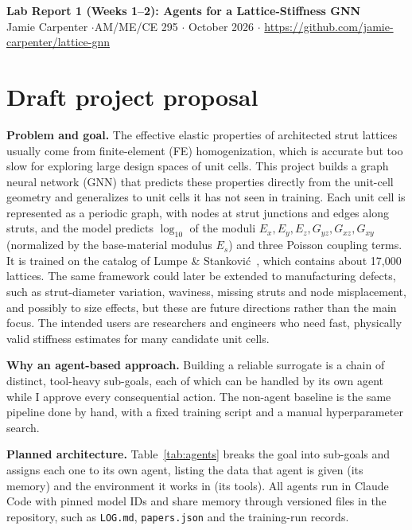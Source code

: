 \documentclass[11pt]{article}
\begin{document}
\begin{center}
  {\Large\bfseries Lab Report 1 (Weeks 1--2): Agents for a Lattice-Stiffness GNN}\\[0.5ex]
  Jamie Carpenter \quad$\cdot$\quad AM/ME/CE 295 \quad$\cdot$ October 2026 \quad$\cdot$\quad
  \url{https://github.com/jamie-carpenter/lattice-gnn}
\end{center}

\section{Draft project proposal}

\textbf{Problem and goal.} The effective elastic properties of architected strut lattices usually
come from finite-element (FE) homogenization, which is accurate but too slow for exploring large
design spaces of unit cells. This project builds a graph neural network (GNN) that predicts these
properties directly from the unit-cell geometry and generalizes to unit cells it has not seen in
training. Each unit cell is represented as a periodic graph, with nodes at strut junctions and edges
along struts, and the model predicts $\log_{10}$ of the moduli $E_x, E_y, E_z, G_{yz}, G_{xz},
G_{xy}$ (normalized by the base-material modulus $E_s$) and three Poisson coupling terms. It is
trained on the catalog of Lumpe \& Stankovi\'c~\cite{lumpe}, which contains about 17,000
lattices. The same framework could later be extended to manufacturing defects, such as
strut-diameter variation, waviness, missing struts and node misplacement, and possibly to size
effects, but these are future directions rather than the main focus. The intended users are
researchers and engineers who need fast, physically valid stiffness estimates for many candidate
unit cells.

\textbf{Why an agent-based approach.} Building a reliable surrogate is a chain of distinct,
tool-heavy sub-goals, each of which can be handled by its own agent while I approve every
consequential action. The non-agent baseline is the same pipeline done by hand, with a fixed
training script and a manual hyperparameter search.

\textbf{Planned architecture.} Table~\ref{tab:agents} breaks the goal into sub-goals and assigns
each one to its own agent, listing the data that agent is given (its memory) and the environment
it works in (its tools). All agents run in Claude Code with pinned model IDs and
share memory through versioned files in the repository, such as \texttt{LOG.md},
\texttt{papers.json} and the training-run records.
\end{document}
